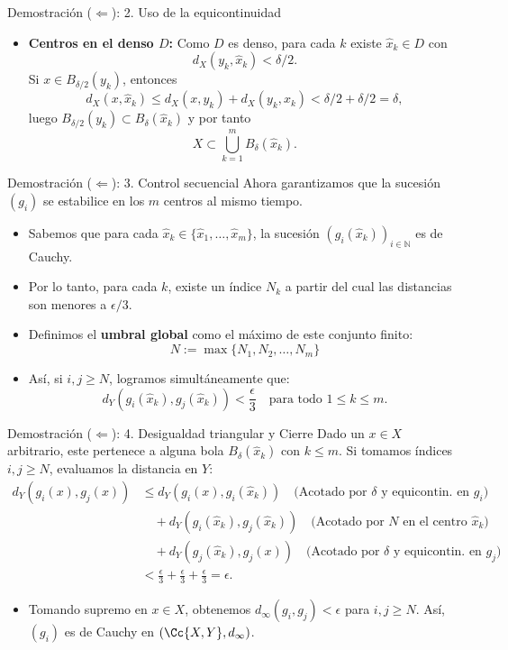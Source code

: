 \begin{frame}{Demostración ($\Leftarrow$): 2. Uso de la equicontinuidad}
    \begin{itemize}
        \item \textbf{Centros en el denso $D$:} Como $D$ es denso, para cada $k$ existe $\hat x_k\in D$ con
        \[ d_X(y_k,\hat x_k)<\delta/2. \]
        Si $x\in B_{\delta/2}(y_k)$, entonces
        \[ d_X(x,\hat x_k)\le d_X(x,y_k)+d_X(y_k,\hat x_k)<\delta/2+\delta/2=\delta, \]
        luego $B_{\delta/2}(y_k)\subset B_{\delta}(\hat x_k)$ y por tanto
        \[ X \subset \bigcup_{k=1}^m B_\delta(\hat{x}_k). \]
    \end{itemize}
\end{frame}

\begin{frame}{Demostración ($\Leftarrow$): 3. Control secuencial}
    Ahora garantizamos que la sucesión $(g_i)$ se estabilice en los $m$ centros al mismo tiempo.
    \begin{itemize}
        \item Sabemos que para cada $\hat{x}_k \in \{\hat{x}_1, \dots, \hat{x}_m\}$, la sucesión $(g_i(\hat{x}_k))_{i\in\mathbb{N}}$ es de Cauchy.
        \item Por lo tanto, para cada $k$, existe un índice $N_k$ a partir del cual las distancias son menores a $\epsilon/3$.
        \item Definimos el \textbf{umbral global} como el máximo de este conjunto finito:
        \[ N := \max\{N_1, N_2, \dots, N_m\} \]
        \item Así, si $i, j \ge N$, logramos simultáneamente que:
        \[ d_Y(g_i(\hat{x}_k), g_j(\hat{x}_k)) < \frac{\epsilon}{3} \quad \text{para todo } 1 \le k \le m. \]
    \end{itemize}
\end{frame}

\begin{frame}{Demostración ($\Leftarrow$): 4. Desigualdad triangular y Cierre}
    Dado un $x \in X$ arbitrario, este pertenece a alguna bola $B_\delta(\hat{x}_k)$ con $k \le m$. Si tomamos índices $i, j \ge N$, evaluamos la distancia en $Y$:
    \begin{align*}
        d_Y(g_i(x), g_j(x)) &\le d_Y(g_i(x), g_i(\hat{x}_k)) \quad \text{(Acotado por $\delta$ y equicontin. en $g_i$)}\\
        &\quad + d_Y(g_i(\hat{x}_k), g_j(\hat{x}_k)) \quad \text{(Acotado por $N$ en el centro $\hat{x}_k$)}\\
        &\quad + d_Y(g_j(\hat{x}_k), g_j(x)) \quad \text{(Acotado por $\delta$ y equicontin. en $g_j$)}\\
        &< \frac{\epsilon}{3} + \frac{\epsilon}{3} + \frac{\epsilon}{3} = \epsilon.
    \end{align*}
    \begin{itemize}
        \item Tomando supremo en $x\in X$, obtenemos $d_{\infty}(g_i,g_j)<\epsilon$ para $i,j\ge N$. Así, $(g_i)$ es de Cauchy en $(\Cc{X,Y},d_\infty)$.
        
    \end{itemize}
\end{frame}

